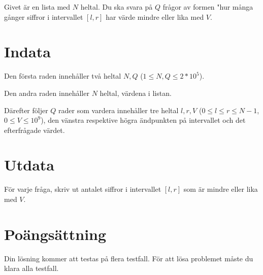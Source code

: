 Givet är en lista med $N$ heltal. Du ska svara på $Q$ frågor av formen "hur många gånger siffror
i intervallet $[l,r]$ har värde mindre eller lika med $V$.

\section*{Indata}
Den första raden innehåller två heltal $N,Q$ ($1 \leq N,Q \leq 2*10^5$).

Den andra raden innehåller $N$ heltal, värdena i listan.

Därefter följer $Q$ rader som vardera innehåller tre heltal $l, r, V$ ($0 \leq l \leq r \leq N-1$, $0 \leq V \leq 10^9$),
den vänstra respektive högra ändpunkten på intervallet och det efterfrågade värdet.

\section*{Utdata}
För varje fråga, skriv ut antalet siffror i intervallet $[l,r]$ som är mindre eller lika med $V$.

\section*{Poängsättning}
Din lösning kommer att testas på flera testfall.
\noindent
För att lösa problemet måste du klara alla testfall.
